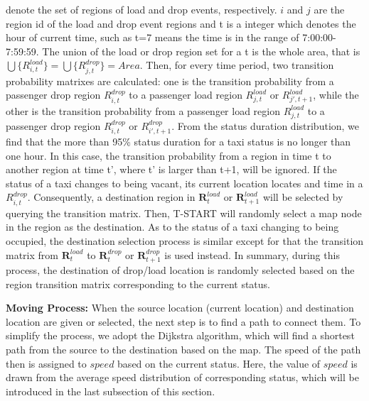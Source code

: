 denote the set of regions of load and drop events, respectively. $i$ and $j$ are the region id of the load and drop event regions and t is a integer which denotes the hour of current time, such as t=7 means the time is in the range of 7:00:00-7:59:59. The union of the load or drop region set for a t is the whole area, that is $\bigcup\{R_{i,t}^{load}\}=\bigcup\{R_{j,t}^{drop}\} = Area $.
Then, for every time period, two transition probability matrixes are calculated: one is the transition probability from a passenger drop region $R_{i,t}^{drop}$ to a passenger load region $R_{j,t}^{load}$ or $R_{j',t+1}^{load}$, while the other is the transition probability from a passenger load region $R_{j,t}^{load}$ to a passenger drop region $R_{i,t}^{drop}$ or $R_{i',t+1}^{drop}$. From the status duration distribution, we find that the more than 95\% status duration for a taxi status is no longer than one hour. In this case, the transition probability from a region in time t to another region at time t’, where t’ is larger than t+1,  will be ignored. 
If the status of a taxi changes to being vacant, its current location locates and time in a $R_{i,t}^{drop}$. Consequently, a destination region in $\textbf{R}_{t}^{load}$ or $\textbf{R}_{t+1}^{load}$ will be selected by querying the transition matrix. Then, T-START will randomly select a map node in the region as the destination. As to the status of a taxi changing to being occupied, the destination selection process is similar except for that the transition matrix from $\textbf{R}_{t}^{load}$ to $\textbf{R}_t^{drop}$ or $\textbf{R}_{t+1}^{drop}$ is used instead. In summary, during this process, the destination of drop/load location is randomly selected based on the region transition matrix corresponding to the current status.

\textbf{Moving Process:} When the source location (current location) and destination location are given or selected, the next step is to find a path to connect them. To simplify the process, we adopt the Dijkstra algorithm, which will find a shortest path from the source to the destination based on the map. The speed of the path then is assigned to $speed$ based on the current status. Here, the value of $speed$ is drawn from the average speed distribution of corresponding status, which will be introduced in the last subsection of this section.

